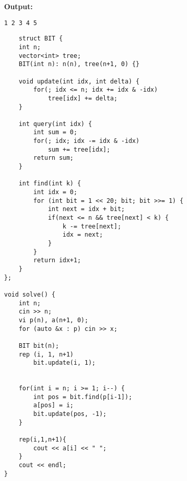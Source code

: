 \textbf{Output:}
\begin{verbatim}
1 2 3 4 5
\end{verbatim}


\begin{lstlisting}
    struct BIT {
    int n;
    vector<int> tree;
    BIT(int n): n(n), tree(n+1, 0) {}

    void update(int idx, int delta) {
        for(; idx <= n; idx += idx & -idx)
            tree[idx] += delta;
    }

    int query(int idx) {
        int sum = 0;
        for(; idx; idx -= idx & -idx)
            sum += tree[idx];
        return sum;
    }

    int find(int k) {
        int idx = 0;
        for (int bit = 1 << 20; bit; bit >>= 1) {
            int next = idx + bit;
            if(next <= n && tree[next] < k) {
                k -= tree[next];
                idx = next;
            }
        }
        return idx+1;
    }
};

void solve() {
    int n;
    cin >> n;
    vi p(n), a(n+1, 0);
    for (auto &x : p) cin >> x;

    BIT bit(n);
    rep (i, 1, n+1)
        bit.update(i, 1);


    for(int i = n; i >= 1; i--) {
        int pos = bit.find(p[i-1]);
        a[pos] = i;
        bit.update(pos, -1);
    }

    rep(i,1,n+1){
        cout << a[i] << " ";
    }
    cout << endl;
}
\end{lstlisting}